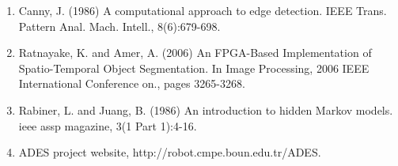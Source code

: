 \documentclass{ws-procs9x6}
\begin{document}
\begin{enumerate}
\noindent \item Canny, J. (1986) A computational approach to edge detection. IEEE Trans. Pattern Anal. Mach. Intell., 8(6):679-698.

\noindent \item Ratnayake, K. and Amer, A. (2006) An FPGA-Based Implementation of Spatio-Temporal Object Segmentation. In Image Processing, 2006 IEEE International Conference on., pages 3265-3268.

\noindent \item Rabiner, L. and Juang, B. (1986) An introduction to hidden Markov models. ieee assp magazine, 3(1 Part 1):4-16.

\noindent \item ADES project website, http://robot.cmpe.boun.edu.tr/ADES.
\end{enumerate}
\end{document}
